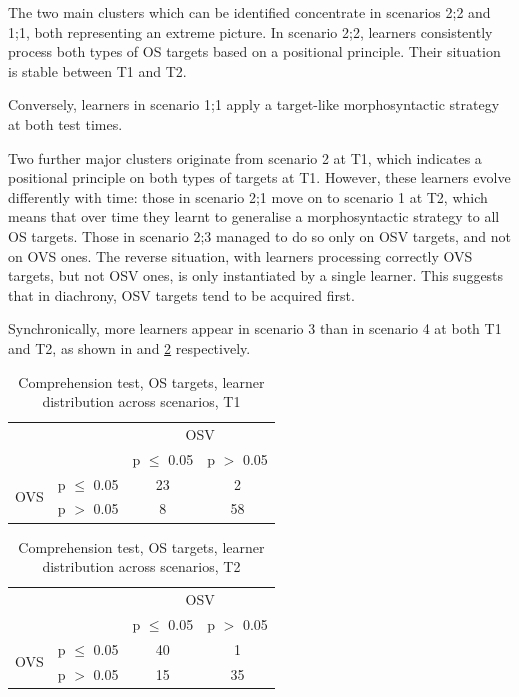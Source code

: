 The two main clusters which can be identified concentrate in scenarios 2;2 and 1;1, both representing an extreme picture. In scenario 2;2, learners consistently process both types of OS targets based on a positional principle. Their situation is stable between T1 and T2. 

Conversely, learners in scenario 1;1 apply a target-like morphosyntactic strategy at both test times. 

Two further major clusters originate from scenario 2 at T1, which indicates a positional principle on both types of targets at T1. However, these learners evolve differently with time: those in scenario 2;1 move on to scenario 1 at T2, which means that over time they learnt to generalise a morphosyntactic strategy to all OS targets. Those in scenario 2;3 managed to do so only on OSV targets, and not on OVS ones. The reverse situation, with learners processing correctly OVS targets, but not OSV ones, is only instantiated by a single learner. This suggests that in diachrony, OSV targets tend to be acquired first.

Synchronically, more learners appear in scenario 3 than in scenario 4 at both T1 and T2, as shown in  and \ref{tab:05:8} respectively.

\begin{table}
    \begin{tabular}{|lc|cc|}
    \hline
    & & \multicolumn{2}{c|}{OSV}\\
    &  & p ${\leq}$ 0.05 & p $>$ 0.05\\
    \hline
    \multirow{2}{*}{OVS} & p ${\leq}$ 0.05 & 23 & 2\\
    & p $>$ 0.05 & 8 & 58\\
    \hline
    \end{tabular}
    \caption{Comprehension test, OS targets, learner distribution across scenarios, T1}
    \label{tab:05:7}
\end{table}

\begin{table}
    \begin{tabular}{|lc|cc|}
    \hline
    & & \multicolumn{2}{c|}{OSV}\\
    &  & p ${\leq}$ 0.05 & p $>$ 0.05\\
    \hline
    \multirow{2}{*}{OVS}& p ${\leq}$ 0.05 & 40 & 1\\
    & p $>$ 0.05 & 15 & 35\\
    \hline
    \end{tabular}
    \caption{Comprehension test, OS targets, learner distribution across scenarios, T2}
    \label{tab:05:8}
\end{table}

